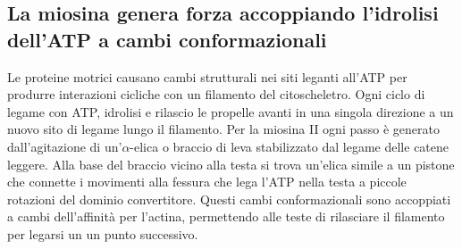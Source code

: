 \subsection{La miosina genera forza accoppiando l'idrolisi dell'ATP a cambi conformazionali}
Le proteine motrici causano cambi strutturali nei siti leganti all'ATP per produrre interazioni cicliche con un filamento del citoscheletro. Ogni ciclo di legame con ATP, idrolisi e 
rilascio le propelle avanti in una singola direzione a un nuovo sito di legame lungo il filamento. Per la miosina II ogni passo \`e generato dall'agitazione di un'$\alpha$-elica o 
braccio di leva stabilizzato dal legame delle catene leggere. Alla base del braccio vicino alla testa si trova un'elica simile a un pistone che connette i movimenti alla fessura che
lega l'ATP nella testa a piccole rotazioni del dominio convertitore. Questi cambi conformazionali sono accoppiati a cambi dell'affinit\`a per l'actina, permettendo alle teste di 
rilasciare il filamento per legarsi un un punto successivo.
